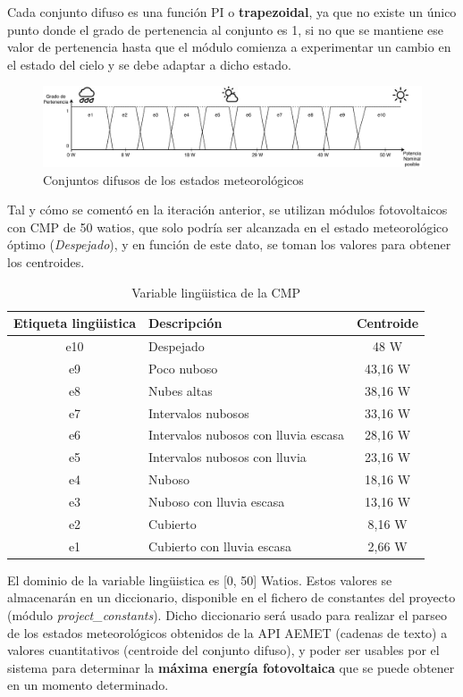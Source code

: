 Cada conjunto difuso es una función PI o \textbf{trapezoidal}, ya que no existe un único punto donde el grado de pertenencia al conjunto es 1, si no que se mantiene ese valor de pertenencia hasta que el módulo comienza a experimentar un cambio en el estado del cielo y se debe adaptar a dicho estado.

\begin{figure}[h]
	\centering
	\includegraphics[width=17cm]{figs/Fuzzy_diagram.pdf}
	\caption{Conjuntos difusos de los estados meteorológicos}
        \label{fig:fuzzySets}
\end{figure}

Tal y cómo se comentó en la iteración anterior, se utilizan módulos fotovoltaicos con \gls{CMP} de 50 watios, que solo podría ser alcanzada en el estado meteorológico óptimo (\textit{Despejado}), y en función de este dato, se toman los valores para obtener los centroides.
\begin{table}[H]
        \centering
        \begin{tabular}{|c|l|c|}
                \hline
                \textbf{Etiqueta lingüistica} & \textbf{Descripción} & \textbf{Centroide} \\ \hline
                e10 & Despejado & 48 W \\ \hline
                e9 & Poco nuboso & 43,16 W \\ \hline
                e8 & Nubes altas & 38,16 W \\ \hline
                e7 & Intervalos nubosos & 33,16 W \\ \hline
                e6 & Intervalos nubosos con lluvia escasa & 28,16 W \\ \hline
                e5 & Intervalos nubosos con lluvia & 23,16 W \\ \hline
                e4 & Nuboso & 18,16 W \\ \hline
                e3 & Nuboso con lluvia escasa & 13,16 W \\ \hline
                e2 & Cubierto & 8,16 W \\ \hline
                e1 & Cubierto con lluvia escasa & 2,66 W\\ \hline
        \end{tabular}
        \caption{Variable lingüistica de la CMP}
        \label{tab:estadosFavorables}
\end{table}

El dominio de la variable lingüistica es [0, 50] Watios. Estos valores se almacenarán en un diccionario, disponible en el fichero de constantes del proyecto (módulo \textit{project\_constants}). Dicho diccionario será usado para realizar el parseo de los estados meteorológicos obtenidos de la \gls{API} \gls{AEMET} (cadenas de texto) a valores cuantitativos (centroide del conjunto difuso), y poder ser usables por el sistema para determinar la \textbf{máxima energía fotovoltaica} que se puede obtener en un momento determinado.
